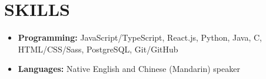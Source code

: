 \documentclass[letterpaper,10pt]{extarticle}
\begin{document}
\section*{SKILLS}
\begin{itemize}
    \item \textbf{Programming:} JavaScript/TypeScript, React.js, Python, Java, C, HTML/CSS/Sass, PostgreSQL, Git/GitHub%
    \item \textbf{Languages:} Native English and Chinese (Mandarin) speaker
\end{itemize}
\end{document}

